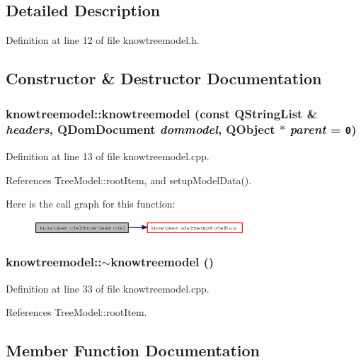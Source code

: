 \subsection{Detailed Description}




Definition at line 12 of file knowtreemodel.h.

\subsection{Constructor \& Destructor Documentation}
\subsubsection{\setlength{\rightskip}{0pt plus 5cm}knowtreemodel::knowtreemodel (const QString\-List \& {\em headers}, QDom\-Document {\em dommodel}, QObject $\ast$ {\em parent} = {\tt 0})}\label{classknowtreemodel_f0739625bf50ab26782b7b18cee9ee49}




Definition at line 13 of file knowtreemodel.cpp.

References Tree\-Model::root\-Item, and setup\-Model\-Data().

Here is the call graph for this function:\begin{figure}[H]
\begin{center}
\leavevmode
\includegraphics[width=223pt]{classknowtreemodel_f0739625bf50ab26782b7b18cee9ee49_cgraph}
\end{center}
\end{figure}
\subsubsection{\setlength{\rightskip}{0pt plus 5cm}knowtreemodel::$\sim$knowtreemodel ()}\label{classknowtreemodel_a89ceb62d7b430e72b8e8be5fb195316}




Definition at line 33 of file knowtreemodel.cpp.

References Tree\-Model::root\-Item.

\subsection{Member Function Documentation}
